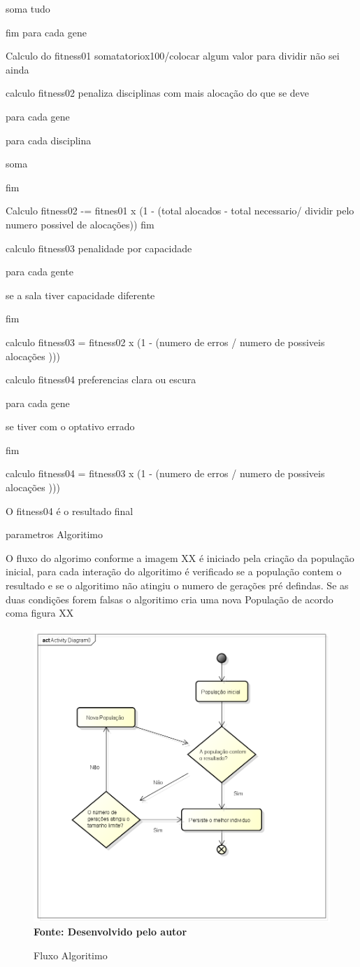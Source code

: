 soma tudo

fim para cada gene

Calculo do fitness01 somatatoriox100/colocar algum valor  para dividir não sei ainda

calculo fitness02 penaliza disciplinas com mais alocação do que se deve

para cada gene 

para cada disciplina 

soma

fim

Calculo fitness02 -= fitnes01 x (1 - (total alocados - total necessario/ dividir pelo numero possivel de alocações))
fim

calculo fitness03 penalidade por capacidade

para cada gente

se a sala tiver capacidade diferente

fim

calculo fitness03 = fitness02 x (1 - (numero de erros /  numero de possiveis alocações )))


calculo fitness04 preferencias clara ou escura

para cada gene 

se tiver com o optativo errado 

fim	

calculo fitness04 = fitness03 x (1 - (numero de erros /  numero de possiveis alocações )))


O fitness04 é o resultado final


parametros Algoritimo

O fluxo do algorimo conforme a imagem XX é iniciado pela criação da população inicial, para cada interação do algoritimo é verificado se a população contem o resultado e se o algoritimo não atingiu o numero de gerações pré defindas. Se as duas condições forem falsas o algoritimo cria uma nova População de acordo coma figura XX

\begin{figure}[!htb]
\caption[Fluxo Algoritimo]{Fluxo Algoritimo}
\label{fig:figura8}
\centering
\includegraphics[scale=0.7]{imagens/fluxoAlgoritimo.png}
\\ \textbf{\footnotesize Fonte: Desenvolvido pelo autor}
\end{figure}